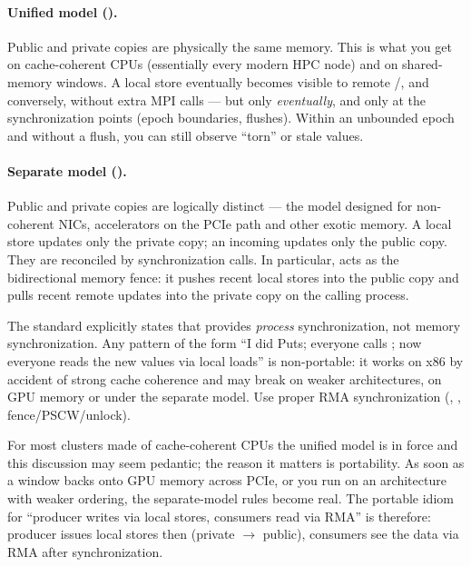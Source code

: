 \paragraph{Unified model ().} Public and private copies are physically the same memory. This is what you get on cache-coherent CPUs (essentially every modern HPC node) and on shared-memory windows. A local store eventually becomes visible to remote /, and conversely, without extra MPI calls --- but only \emph{eventually}, and only at the synchronization points (epoch boundaries, flushes). Within an unbounded epoch and without a flush, you can still observe ``torn'' or stale values.

\paragraph{Separate model ().} Public and private copies are logically distinct --- the model designed for non-coherent NICs, accelerators on the PCIe path and other exotic memory. A local store updates only the private copy; an incoming  updates only the public copy. They are reconciled by synchronization calls. In particular,  acts as the bidirectional memory fence: it pushes recent local stores into the public copy and pulls recent remote updates into the private copy on the calling process.

\begin{warningblock}
    The standard explicitly states that  provides \emph{process} synchronization, not memory synchronization. Any pattern of the form ``I did Puts; everyone calls ; now everyone reads the new values via local loads'' is non-portable: it works on x86 by accident of strong cache coherence and may break on weaker architectures, on GPU memory or under the separate model. Use proper RMA synchronization (, , fence/PSCW/unlock).
\end{warningblock}

For most clusters made of cache-coherent CPUs the unified model is in force and this discussion may seem pedantic; the reason it matters is portability. As soon as a window backs onto GPU memory across PCIe, or you run on an architecture with weaker ordering, the separate-model rules become real. The portable idiom for ``producer writes via local stores, consumers read via RMA'' is therefore: producer issues local stores then  (private $\to$ public), consumers see the data via RMA after synchronization.

